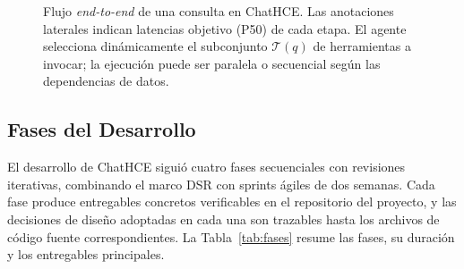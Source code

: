 \begin{figure}[t]
\caption{Flujo \textit{end-to-end} de una consulta en ChatHCE. Las anotaciones laterales indican latencias objetivo (P50) de cada etapa. El agente selecciona dinámicamente el subconjunto $\mathcal{T}(q)$ de herramientas a invocar; la ejecución puede ser paralela o secuencial según las dependencias de datos.}
\label{fig:flujo_end2end}
\end{figure}

\subsection{Fases del Desarrollo}
\label{sec:fases}

El desarrollo de ChatHCE siguió cuatro fases secuenciales con revisiones iterativas, combinando el marco DSR con sprints ágiles de dos semanas. Cada fase produce entregables concretos verificables en el repositorio del proyecto, y las decisiones de diseño adoptadas en cada una son trazables hasta los archivos de código fuente correspondientes. La Tabla~\ref{tab:fases} resume las fases, su duración y los entregables principales.

